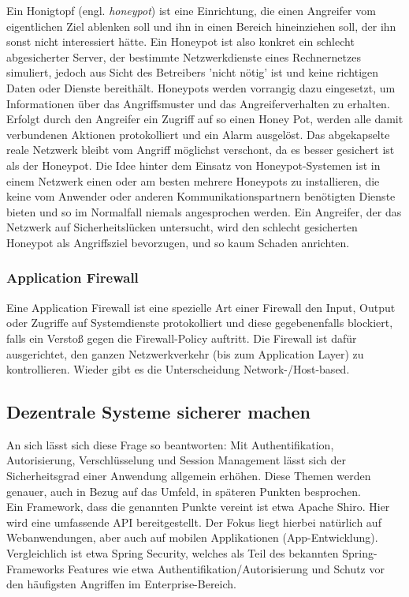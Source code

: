 \documentclass[letterpaper, 12pt]{article}
\let\tempsubsection\subsection
\renewcommand\subsection[1]{\vspace{0cm}\tempsubsection{#1}\vspace{0cm}}
\let\tempsubsubsection\subsubsection
\renewcommand\subsubsection[1]{\vspace{0cm}\tempsubsubsection{#1}\vspace{0cm}}
\begin{document}
Ein Honigtopf (engl. \textit{honeypot}) ist eine Einrichtung, die einen Angreifer vom
eigentlichen Ziel ablenken soll und ihn in einen Bereich hineinziehen soll, der ihn sonst
nicht interessiert hätte. Ein Honeypot ist also
konkret ein schlecht abgesicherter Server, der bestimmte Netzwerkdienste eines Rechnernetzes simuliert, jedoch aus Sicht des Betreibers 'nicht nötig' ist und keine richtigen Daten oder Dienste bereithält. Honeypots werden vorrangig dazu eingesetzt, um Informationen
über das Angriffsmuster und das Angreiferverhalten zu erhalten. Erfolgt durch
den Angreifer ein Zugriff auf so einen Honey Pot, werden alle damit verbundenen Aktionen
protokolliert und ein Alarm ausgelöst. Das abgekapselte reale Netzwerk
bleibt vom Angriff möglichst verschont, da es besser gesichert ist als der Honeypot. Die Idee hinter dem Einsatz von Honeypot-Systemen ist in einem Netzwerk einen
oder am besten mehrere Honeypots zu installieren, die keine vom Anwender oder anderen
Kommunikationspartnern benötigten Dienste bieten und so im Normalfall niemals
angesprochen werden. Ein Angreifer, der das Netzwerk auf Sicherheitslücken untersucht, wird den schlecht gesicherten Honeypot als Angriffsziel bevorzugen, und so kaum Schaden anrichten. \cite{ausarbeitungsec}

\subsubsection{Application Firewall}

Eine Application Firewall ist eine spezielle Art einer Firewall den Input, Output oder Zugriffe auf Systemdienste protokolliert
und diese gegebenenfalls blockiert, falls ein Verstoß gegen die Firewall-Policy
auftritt. Die Firewall ist dafür ausgerichtet, den ganzen Netzwerkverkehr (bis zum Application
Layer) zu kontrollieren. Wieder gibt es die Unterscheidung Network-/Host-based. \cite{ausarbeitungsec}

\subsection{Dezentrale Systeme sicherer machen}

An sich lässt sich diese Frage so beantworten: Mit Authentifikation, Autorisierung, Verschlüsselung und Session Management lässt sich der Sicherheitsgrad einer Anwendung allgemein erhöhen. Diese Themen werden genauer, auch in Bezug auf das Umfeld, in späteren Punkten besprochen. \\
Ein Framework, dass die genannten Punkte vereint ist etwa Apache Shiro. Hier wird eine umfassende API bereitgestellt. Der Fokus liegt hierbei natürlich auf Webanwendungen, aber auch auf mobilen Applikationen (App-Entwicklung). Vergleichlich ist etwa Spring Security, welches als Teil des bekannten Spring-Frameworks Features wie etwa Authentifikation/Autorisierung und Schutz vor den häufigsten Angriffen im Enterprise-Bereich. \cite{shiro, springsec}
\end{document}
